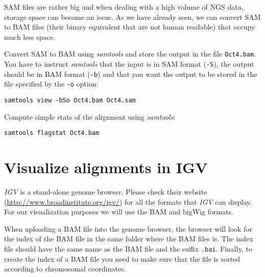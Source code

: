\begin{note}
SAM files are rather big and when dealing with a high volume of NGS data,
storage space can become an issue. As we have already seen, we can convert SAM
to BAM files (their binary equivalent that are not human readable) that occupy
much less space.
\end{note}

\begin{steps}
Convert SAM to BAM using \emph{samtools} and store the output in the file
\texttt{Oct4.bam}. You have to instruct \emph{samtools} that the input is in SAM
format (\texttt{-S}), the output should be in BAM format (\texttt{-b}) and that
you want the output to be stored in the file specified by the \texttt{-o}
option:

\begin{lstlisting}
samtools view -bSo Oct4.bam Oct4.sam
\end{lstlisting}
\end{steps}

\begin{advanced}
Compute simple stats of the alignment using \emph{samtools}:

\begin{lstlisting}
samtools flagstat Oct4.bam
\end{lstlisting}
\end{advanced}

\section{Visualize alignments in IGV}

\begin{information}
\emph{IGV} is a stand-alone genome browser. Please check their website
(\url{http://www.broadinstitute.org/igv/}) for all the formats that \emph{IGV}
can display. For our visualization purposes we will use the BAM and bigWig
formats.
\end{information}

\begin{note}
When uploading a BAM file into the genome browser, the browser will look for the
index of the BAM file in the same folder where the BAM files is. The index file
should have the same name as the BAM file and the suffix \texttt{.bai}. Finally, to
create the index of a BAM file you need to make sure that the file is sorted
according to chromosomal coordinates.
\end{note}


